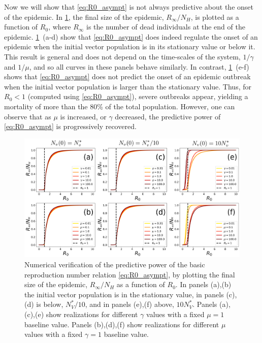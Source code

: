 Now we will show that \cref{eq:R0_asympt} is not always predictive about the
onset of the epidemic. In \cref{fig:R0_check_stationary}, the final size of the
epidemic, $R_{\infty}/N_H$, is plotted as a function of $R_0$, where $R_\infty$
is the number of dead individuals at the end of the epidemic.
\cref{fig:R0_check_stationary}~\textcolor{ref_color}{(a-d)} show that
\cref{eq:R0_asympt} does indeed
regulate the onset of an epidemic when the initial vector population is in its
stationary value or below it. This result is general and does not depend on the
time-scales of the system, $1/\gamma$ and $1/\mu$, and so all curves in these
panels behave similarly. In contrast,
\cref{fig:R0_check_stationary}~\textcolor{ref_color}{(e-f)}
shows that \cref{eq:R0_asympt} does not predict the onset of an epidemic
outbreak when the initial vector population is larger than the stationary
value. Thus, for $R_0<1$ (computed using  \cref{eq:R0_asympt}), severe
outbreaks appear, yielding a mortality of more than the 80\% of the total
population. However, one can observe that  as $\mu$ is increased, or $\gamma$
decreased, the predictive power of \cref{eq:R0_asympt} is progressively
recovered.

\begin{figure}[t!]
    \centering
    \includegraphics[width=\textwidth]{Figures/R0_check_stationary.pdf}
    \caption[
        Numerical verification of the predictive power of the
        stationary basic reproduction number
    ]{Numerical verification of the predictive	power of the basic
        reproduction number relation \cref{eq:R0_asympt}, by plotting the final
        size of the epidemic, $R_\infty/N_H$ as a function of $R_0$. In panels
        (a),(b) the initial vector population is in the stationary value, in
        panels (c),(d) is below, $N_V^*/10$, and in panels (e),(f) above, $10
            N_V^*$. Panels (a),(c),(e) show realizations for different $\gamma$
        values with a fixed $\mu=1$ baseline value. Panels (b),(d),(f) show
        realizations for different $\mu$ values with a fixed $\gamma=1$
        baseline value.}
    \label{fig:R0_check_stationary}
\end{figure}

